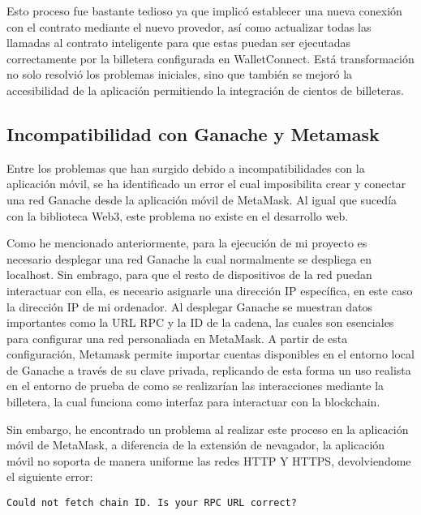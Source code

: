 Esto proceso fue bastante tedioso ya que implicó establecer una nueva conexión con el contrato mediante el nuevo provedor, así como actualizar todas las llamadas al contrato inteligente para que estas puedan ser ejecutadas correctamente por la billetera configurada en WalletConnect.
Está transformación no solo resolvió los problemas iniciales, sino que también se mejoró la accesibilidad de la aplicación permitiendo la integración de cientos de billeteras.



\subsection{Incompatibilidad con Ganache y Metamask}

Entre los problemas que han surgido debido a incompatibilidades con la aplicación móvil, se ha identificado un error el cual imposibilita crear y conectar una red Ganache desde la aplicación móvil de MetaMask. Al igual que sucedía con la biblioteca Web3, este problema no existe en el desarrollo web.

Como he mencionado anteriormente, para la ejecución de mi proyecto es necesario desplegar una red Ganache la cual normalmente se despliega en localhost. Sin embrago, para que el resto de dispositivos de la red puedan interactuar con ella, es neceario asignarle una dirección IP específica, en este caso la dirección IP de mi ordenador.
Al desplegar Ganache se muestran datos importantes como la URL RPC y la ID de la cadena, las cuales son esenciales para configurar una red personaliada en MetaMask.
A partir de esta configuración, Metamask permite importar cuentas disponibles en el entorno local de Ganache a través de su clave privada, replicando de esta forma un uso realista en el entorno de prueba de como se realizarían las interacciones mediante la billetera, la cual funciona como interfaz para interactuar con la blockchain.

Sin embargo, he encontrado un problema al realizar este proceso en la aplicación móvil de MetaMask, a diferencia de la extensión de nevagador, la aplicación móvil no soporta de manera uniforme las redes HTTP Y HTTPS, devolviendome el siguiente error:

\begin{verbatim}
Could not fetch chain ID. Is your RPC URL correct?
\end{verbatim}

